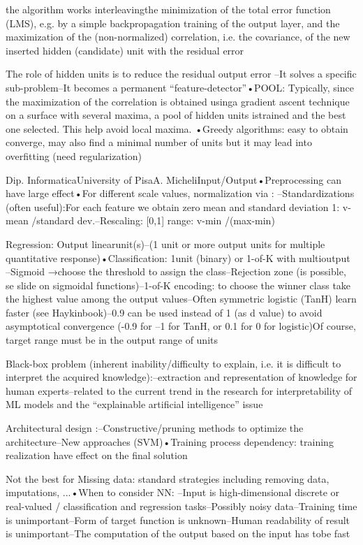  the algorithm works interleavingthe minimization of the total error function (LMS), e.g. by a simple backpropagation training of the output layer, and the maximization of the (non-normalized) correlation, i.e. the covariance, of the new inserted hidden (candidate) unit with the residual error

 The role of hidden units is to reduce the residual output error –It solves a specific sub-problem–It becomes a permanent “feature-detector”•POOL: Typically, since the maximization of the correlation is obtained usinga gradient ascent technique on a surface with several maxima, a pool of hidden units istrained and the best one selected. This help avoid local maxima. •Greedy algorithms: easy to obtain converge, may also find a minimal  number of units but it may lead into overfitting (need regularization)

 Dip. InformaticaUniversity of PisaA. MicheliInput/Output•Preprocessing  can have large effect•For different scale values, normalization via : –Standardizations (often useful):For each feature we obtain zero mean and standard deviation 1: v-mean /standard dev.–Rescaling: [0,1] range: v-min /(max-min)

 Regression: Output linearunit(s)–(1 unit or more output units for multiple quantitative response)•Classification: 1unit  (binary) or 1-of-K with multioutput –Sigmoid →choose the threshold to assign the class–Rejection zone (is possible, se slide on sigmoidal functions)–1-of-K encoding: to choose the winner class take the highest value among the output values–Often symmetric logistic (TanH) learn faster (see Haykinbook)–0.9 can be used instead of  1 (as d value) to avoid asymptotical convergence      (-0.9 for –1 for TanH, or 0.1 for 0 for logistic)Of course, target range must be in the output range of units

Black-box problem (inherent inability/difficulty to explain, i.e. it is difficult to interpret the acquired knowledge):–extraction and representation of knowledge for human experts–related to the current trend in the research for interpretability of ML models and the “explainable artificial intelligence” issue

Architectural design :–Constructive/pruning methods to optimize the architecture–New approaches (SVM)•Training process dependency: training realization have effect on the final solution

 Not the best for Missing data: standard strategies including removing data, imputations, ...•When to consider NN: –Input is high-dimensional discrete or real-valued / classification and regression tasks–Possibly noisy data–Training time is unimportant–Form of target function is unknown–Human readability of result is unimportant–The computation of the output based on the input has tobe fast



